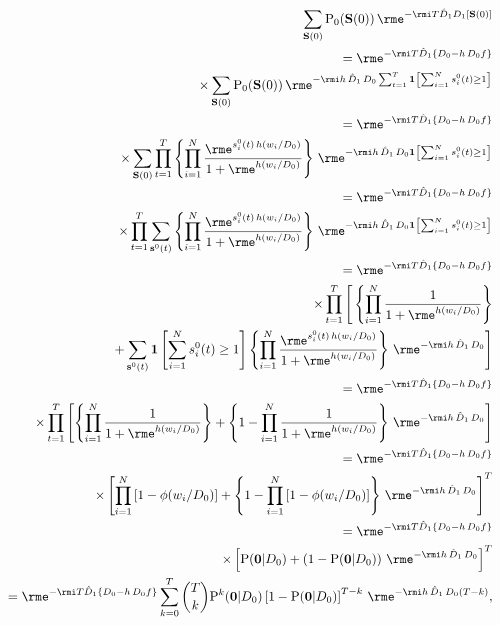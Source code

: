 \documentclass[10pt]{iopart}
\newcommand{\1}{\mathbf{1}}
\newcommand{\Prob}{\mathrm{P}}
\newcommand{\sv}{\ensuremath{\mathbf{s}}}
\newcommand{\Sm}{\ensuremath{\mathbf{S}}}
\begin{document}
\begin{eqnarray}
&&\sum_{\Sm(0)}\Prob_0(\Sm(0))\,\rme^{-\rmi T\hat{D}_{1} D_{1}[\Sm(0)]}\nonumber\\
&&~=\rme^{-\rmi T\hat{D}_{1} \left\{D_{0}-h\,D_{0}f \right\}}\nonumber\\
%
&&~~~\times\sum_{\Sm(0)}\Prob_0(\Sm(0))\,\rme^{-\rmi h\,\hat{D}_{1} \,D_{0} \sum_{t=1}^T\1\left[\sum_{i=1}^N s_i^0(t)\ge1\right]}\nonumber\\
%
&&~=\rme^{-\rmi T\hat{D}_{1} \left\{D_{0}-h\,D_{0}f \right\}}\nonumber\\
%
&&~~~\times\sum_{\Sm(0)}\prod_{t=1}^T\left\{\prod_{i=1}^N\frac{\rme^{s^0_i(t)\,h(w_i/D_0)}}{1+\rme^{h(w_i/D_0)}}\right\}\,\rme^{-\rmi h\,\hat{D}_{1} \,D_{0} \1\left[\sum_{i=1}^N s_i^0(t)\ge1\right]}\nonumber\\
%
&&~=\rme^{-\rmi T\hat{D}_{1} \left\{D_{0}-h\,D_{0}f \right\}}\nonumber\\
%
&&~~~\times\prod_{t=1}^T\sum_{\sv^0(t)}\left\{\prod_{i=1}^N\frac{\rme^{s^0_i(t)\,h(w_i/D_0)}}{1+\rme^{h(w_i/D_0)}}\right\}\,\rme^{-\rmi h\,\hat{D}_{1} \,D_{0} \1\left[\sum_{i=1}^N s_i^0(t)\ge1\right]}\nonumber\\
%
&&~=\rme^{-\rmi T\hat{D}_{1} \left\{D_{0}-h\,D_{0}f \right\}}\nonumber\\
%
&&~~~\times\prod_{t=1}^T\Bigg[\left\{\prod_{i=1}^N\frac{1}{1+\rme^{h(w_i/D_0)}}\right\}\nonumber\\
%
&&~~~+\sum_{\sv^0(t)}\1\left[\sum_{i=1}^N s_i^0(t)\ge1\right]\left\{\prod_{i=1}^N\frac{\rme^{s^0_i(t)\,h(w_i/D_0)}}{1+\rme^{h(w_i/D_0)}}\right\}\,\rme^{-\rmi h\,\hat{D}_{1} \,D_{0} }\Bigg]\nonumber\\
%
&&~=\rme^{-\rmi T\hat{D}_{1} \left\{D_{0}-h\,D_{0}f \right\}}\nonumber\\
%
&&~~~\times\prod_{t=1}^T\left[\left\{\prod_{i=1}^N\frac{1}{1+\rme^{h(w_i/D_0)}}\right\}+\left\{1-\prod_{i=1}^N\frac{1}{1+\rme^{h(w_i/D_0)}}\right\}\,\rme^{-\rmi h\,\hat{D}_{1} \,D_{0} }\right]\nonumber\\
%
&&~=\rme^{-\rmi T\hat{D}_{1} \left\{D_{0}-h\,D_{0}f \right\}}\nonumber\\
%
&&~~~\times\left[\prod_{i=1}^N\left[1-\phi(w_i/D_0)\right]+\left\{1-\prod_{i=1}^N\left[1-\phi(w_i/D_0)\right]\right\}\,\rme^{-\rmi h\,\hat{D}_{1} \,D_{0} }\right]^T\nonumber\\
%
&&~=\rme^{-\rmi T\hat{D}_{1} \left\{D_{0}-h\,D_{0}f \right\}}\nonumber\\
%
&&~~~\times\left[\Prob(\mathbf{0}\vert D_0)+\left(1-\Prob(\mathbf{0}\vert D_0)\right)\,\rme^{-\rmi h\,\hat{D}_{1} \,D_{0} }\right]^T\nonumber\\
%
&&~=\rme^{-\rmi T\hat{D}_{1} \left\{D_{0}-h\,D_{0}f \right\}}\sum_{k=0}^T{T\choose k}\Prob^k(\mathbf{0}\vert D_0)\left[1-\Prob(\mathbf{0}\vert D_0)\right]^{T-k}\,\rme^{-\rmi h\,\hat{D}_{1} \,D_{0} (T-k)},
%
\end{eqnarray}
\end{document}
